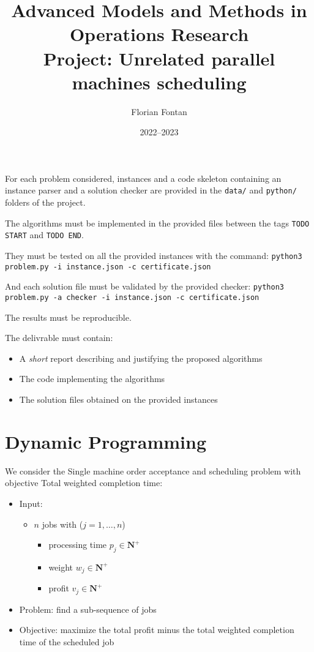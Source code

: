\documentclass[a4paper,twocolumn]{article}
\author{Florian Fontan}
\title{Advanced Models and Methods in Operations Research \\ Project: Unrelated parallel machines scheduling}
\date{2022--2023}
\newcommand{\N}{\mathbf{N}}
\begin{document}
\maketitle

For each problem considered, instances and a code skeleton containing an instance parser and a solution checker are provided in the \texttt{data/} and \texttt{python/} folders of the project.

The algorithms must be implemented in the provided files between the tags \texttt{TODO START} and \texttt{TODO END}.

They must be tested on all the provided instances with the command:
\texttt{python3 problem.py -i instance.json -c certificate.json}

And each solution file must be validated by the provided checker:
\texttt{python3 problem.py -a checker -i instance.json -c certificate.json}

The results must be reproducible.

\bigskip

The delivrable must contain:
\begin{itemize}
  \item A \emph{short} report describing and justifying the proposed algorithms
  \item The code implementing the algorithms
  \item The solution files obtained on the provided instances
\end{itemize}

\section{Dynamic Programming}

We consider the Single machine order acceptance and scheduling problem with objective Total weighted completion time:
\begin{itemize}
  \item Input:
    \begin{itemize}
      \item $n$ jobs with ($j = 1, \dots, n$)
        \begin{itemize}
          \item processing time $p_j \in \N^+$
          \item weight $w_j \in \N^+$
          \item profit $v_j \in \N^+$
        \end{itemize}
    \end{itemize}
  \item Problem: find a sub-sequence of jobs
  \item Objective: maximize the total profit minus the total weighted completion time of the scheduled job
\end{itemize}
\end{document}
